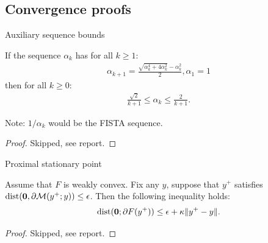\documentclass[11pt]{beamer}
\begin{document}
    \subsection{Convergence proofs}
        \begin{frame}{Auxiliary sequence bounds}
            \begin{lemma}
                If the sequence $\alpha_k$ has for all $k\ge 1$: 
                \begin{align*}
                    \alpha_{k + 1} = \frac{\sqrt{\alpha_k^4 + 4\alpha_k^2} - \alpha_k^2}{2}, \alpha_1 = 1
                \end{align*}
                then for all $k \ge0$: 
                \begin{align*}
                    \frac{\sqrt{2}}{k + 1} \le \alpha_k \le \frac{2}{k + 1}. 
                \end{align*}    
            \end{lemma}
            Note: $1/\alpha_k$ would be the FISTA sequence. 
            \begin{proof}
                Skipped,  see report. 
            \end{proof}
        \end{frame}
        \begin{frame}{Proximal stationary point}
            \begin{lemma}[Lemma B.2]
                Assume that $F$ is weakly convex. 
                Fix any $y$, suppose that $y^+$ satisfies $\operatorname{dist}(\mathbf 0,\partial \mathcal M(y^+; y)) \le \epsilon$. Then the following inequality holds: 
                \begin{align*}
                    \operatorname{dist}(\mathbf 0; \partial F(y^+)) 
                    \le \epsilon + \kappa\Vert y^+ - y\Vert. 
                \end{align*}    
            \end{lemma}
            \begin{proof}
                Skipped, see report. 
            \end{proof}
        \end{frame}
\end{document}
